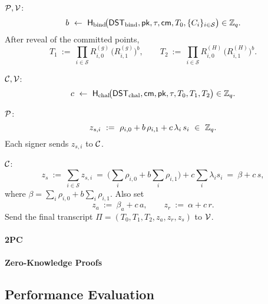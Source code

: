 \begin{center}
{{\smallskip
\(\mathcal P,\mathcal V\): 
\[
b\ \leftarrow\ \Hbind\!\big(\dstbind,\mathsf{pk},\tau,\cm, T_0, \{C_i\}_{i\in\mathcal S}\big)\in\Zq.
\]
After reveal of the committed points,
\[
T_1\ :=\ \prod_{i\in\mathcal S} R^{(g)}_{i,0}\,\big(R^{(g)}_{i,1}\big)^{b},\qquad
T_2\ :=\ \prod_{i\in\mathcal S} R^{(H)}_{i,0}\,\big(R^{(H)}_{i,1}\big)^{b}.
\]

\smallskip
\(\mathcal C,\mathcal V\): 
\[
c\ \leftarrow\ \Hchal\!\big(\dstchal,\cm,\mathsf{pk},\tau, T_0,T_1,T_2\big)\in\Zq.
\]

\smallskip
\(\mathcal P\): 
\[
z_{s,i}\ :=\ \rho_{i,0}+b\,\rho_{i,1}+c\,\lambda_i\,s_i\ \in\ \Zq.
\]
Each signer sends $z_{s,i}$ to $\mathcal C$.

\smallskip
\(\mathcal C\):  \ttfamily{\textcolor{gray}{Aggregate and output.}}
\[
z_s\ :=\ \sum_{i\in\mathcal S} z_{s,i}\ =\ \Big(\textstyle\sum_{i}\rho_{i,0}+b\sum_{i}\rho_{i,1}\Big) + c\sum_{i}\lambda_i s_i\ =\ \beta + c\,s,
\]
where $\beta=\sum_{i}\rho_{i,0}+b\sum_{i}\rho_{i,1}$. Also set
\[
z_a\ :=\ \beta_a + c\,a,\qquad z_r\ :=\ \alpha + c\,r.
\]
Send the final transcript $\Pi=(T_0,T_1,T_2,z_a,z_r,z_s)$ to $\mathcal V$.
}%
}
\end{center}


\begin{center}
\end{center}








\paragraph{2PC}

\paragraph{Zero-Knowledge Proofs}

\subsection{Performance Evaluation}

% 
